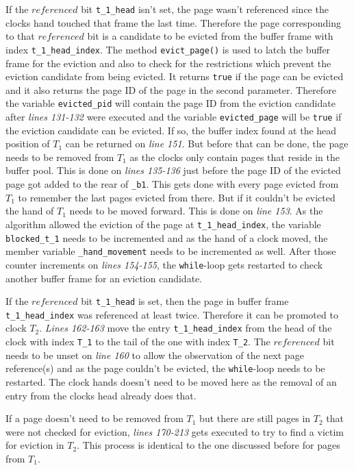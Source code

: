     If the $referenced$ bit \lstinline{t_1_head} isn't set, the page wasn't referenced since the clocks hand touched that frame the last time. Therefore the page corresponding to that $referenced$ bit is a candidate to be evicted from the buffer frame with index \lstinline{t_1_head_index}. The method \lstinline{evict_page()} is used to latch the buffer frame for the eviction and also to check for the restrictions which prevent the eviction candidate from being evicted. It returns \lstinline{true} if the page can be evicted and it also returns the page ID of the page in the second parameter. Therefore the variable \lstinline{evicted_pid} will contain the page ID from the eviction candidate after \emph{lines 131-132} were executed and the variable \lstinline{evicted_page} will be \lstinline{true} if the eviction candidate can be evicted. If so, the buffer index found at the head position of $T_1$ can be returned on \emph{line 151}. But before that can be done, the page needs to be removed from $T_1$ as the clocks only contain pages that reside in the buffer pool. This is done on \emph{lines 135-136} just before the page ID of the evicted page got added to the rear of \lstinline{_b1}. This gets done with every page evicted from $T_1$ to remember the last pages evicted from there. But if it couldn't be evicted the hand of $T_1$ needs to be moved forward. This is done on \emph{line 153}. As the algorithm allowed the eviction of the page at \lstinline{t_1_head_index}, the variable \lstinline{blocked_t_1} needs to be incremented and as the hand of a clock moved, the member variable \lstinline{_hand_movement} needs to be incremented as well. After those counter increments on \emph{lines 154-155}, the \lstinline{while}-loop gets restarted to check another buffer frame for an eviction candidate.

    If the $referenced$ bit \lstinline{t_1_head} is set, then the page in buffer frame \lstinline{t_1_head_index} was referenced at least twice. Therefore it can be promoted to clock $T_2$. \emph{Lines 162-163} move the entry \lstinline{t_1_head_index} from the head of the clock with index \lstinline{T_1} to the tail of the one with index \lstinline{T_2}. The $referenced$ bit needs to be unset on \emph{line 160} to allow the observation of the next page reference(s) and as the page couldn't be evicted, the \lstinline{while}-loop needs to be restarted. The clock hands doesn't need to be moved here as the removal of an entry from the clocks head already does that.

    If a page doesn't need to be removed from $T_1$ but there are still pages in $T_2$ that were not checked for eviction, \emph{lines 170-213} gets executed to try to find a victim for eviction in $T_2$. This process is identical to the one discussed before for pages from $T_1$.

